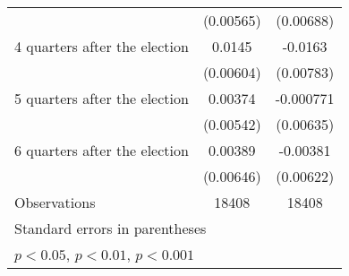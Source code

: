 \begin{table}[htbp]
\begin{tabular}{l*{2}{c}}
                    &   (0.00565)         &   (0.00688)         \\
[1em]
 4 quarters after the election&      0.0145\sym{*}  &     -0.0163\sym{*}  \\
                    &   (0.00604)         &   (0.00783)         \\
[1em]
 5 quarters after the election&     0.00374         &   -0.000771         \\
                    &   (0.00542)         &   (0.00635)         \\
[1em]
 6 quarters after the election&     0.00389         &    -0.00381         \\
                    &   (0.00646)         &   (0.00622)         \\
\hline
Observations        &       18408         &       18408         \\
\hline\hline
\multicolumn{3}{l}{\footnotesize Standard errors in parentheses}\\
\multicolumn{3}{l}{\footnotesize \sym{*} \(p<0.05\), \sym{**} \(p<0.01\), \sym{***} \(p<0.001\)}\\
\end{tabular}
\end{table}
